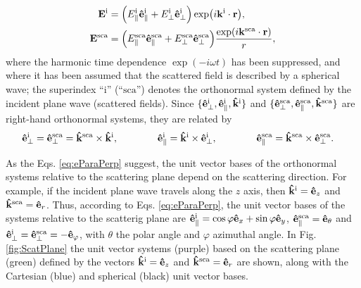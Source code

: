  \begin{align}
	\vb{E}^\text{i} & =  \qty(E_\parallel^\text{i}\vu{e}^\text{i}_\parallel + E_\perp^\text{i} \vu{e}_\perp^\text{i}) \exp(i\vb{k}^\text{i}\cdot\vb{r}),
 \label{eq:Ei} \\
	\vb{E}^\text{sca} & = \qty(E_\parallel^\text{sca}\vu{e}^\text{sca}_\parallel + E_\perp^\text{sca} \vu{e}_\perp^\text{sca}) \frac{\exp(i\vb{k}^\text{sca}\cdot\vb{r})}{r},
 \label{eq:Es}
 \end{align}
%
where the harmonic time dependence  $\exp(-i\omega t)$ has been suppressed, and where it has been assumed that the scattered field is described by a spherical wave; the superindex ``$\text{i}$'' (``$\text{sca}$'') denotes the orthonormal system defined by the incident plane wave (scattered fields).  Since $\{\vu{e}_\perp^\text{i}, \vu{e}_\parallel^\text{i},\vu{k}^\text{i} \}$ and $\{\vu{e}_\perp^\text{sca}, \vu{e}_\parallel^\text{sca},\vu{k}^\text{sca} \}$ are right-hand orthonormal systems, they are related by
%
 \begin{align}
	\vu{e}_\perp^\text{i} = \vu{e}_\perp^\text{sca}  & =  \vu{k}^\text{sca} \times \vu{k}^\text{i},
		\qquad\qquad
	\vu{e}^\text{i}_\parallel = \vu{k}^\text{i}\times \vu{e}^\text{i}_\perp,
		\qquad\qquad
	\vu{e}^\text{sca}_\parallel = \vu{k}^\text{sca} \times \vu{e}_\perp^\text{sca}.
 \label{eq:eParaPerp}
 \end{align}
%

As the Eqs. \eqref{eq:eParaPerp} suggest, the unit vector bases of the orthonormal systems relative to the scattering plane depend on the scattering direction. For example, if the incident plane wave travels along the $z$ axis, then $\vu{k}^\text{i} = \vu{e}_z$ and $\vu{k}^\text{sca} = \vu{e}_r$. Thus, according to Eqs. \eqref{eq:eParaPerp}, the unit vector bases of the systems relative to the scatterig plane are   $\vu{e}_\parallel^\text{i} = \cos\varphi \vu{e}_x +\sin\varphi \vu{e}_y$, $\vu{e}_\parallel^\text{sca} = \vu{e}_\theta$ and $\vu{e}_\perp^\text{i} = \vu{e}_\perp^\text{sca}  = - \vu{e}_\varphi$, with $\theta$ the polar angle and $\varphi$ azimuthal angle. In Fig. \ref{fig:ScatPlane} the unit vector systems (purple) based on the  scattering plane  (green) defined by the vectors $\vu{k}^\text{i}=\vu{e}_z$ and $\vu{k}^\text{sca} = \vu{e}_r$ are shown, along with the Cartesian (blue) and spherical (black) unit vector bases.

